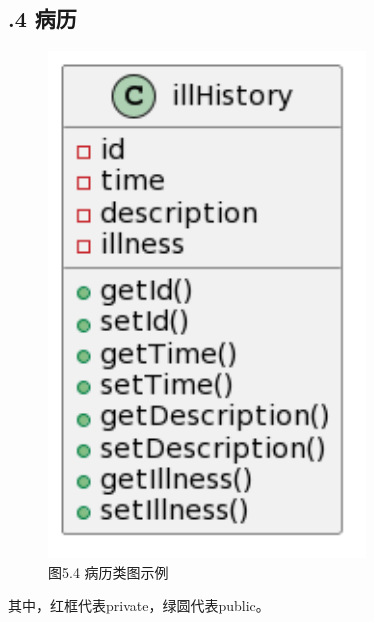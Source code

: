 \documentclass[24pt,a4paper]{article}%
\begin{document}
\subsection*{.4 病历}
\begin{figure}[H]
    \centering
    \includegraphics[width=0.75\textwidth]{images/illHistory.png}
    \caption*{图5.4 病历类图示例}
\end{figure}
其中，红框代表private，绿圆代表public。
\end{document}
